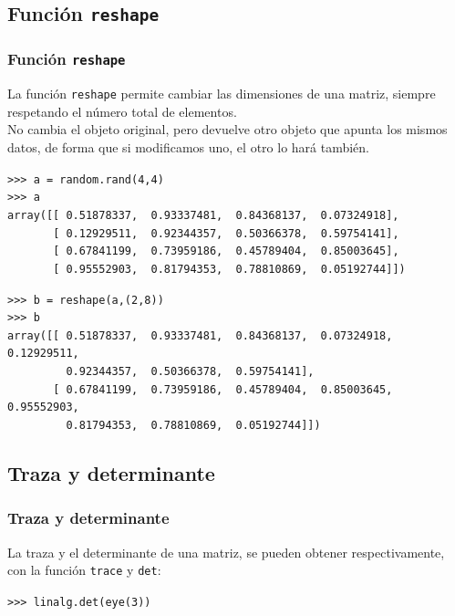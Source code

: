 \subsection{Funci\'{o}n \texttt{reshape}}
\begin{frame}
\frametitle{Funci\'{o}n \texttt{reshape}}
La funci\'{o}n \texttt{reshape} permite cambiar las dimensiones de una matriz, siempre respetando el n\'{u}mero total de elementos.
\\
\bigskip
No cambia el objeto original, pero devuelve otro objeto que apunta los mismos datos, de forma que si modificamos uno, el otro lo har\'{a} tambi\'{e}n.
\end{frame}
\begin{frame}[fragile]
\verb|>>> a = random.rand(4,4)| \\
\fontsize{10}{10}\selectfont
\pause
\verb|>>> a| \\
\verb|array([[ 0.51878337,  0.93337481,  0.84368137,  0.07324918],| \\
\verb|       [ 0.12929511,  0.92344357,  0.50366378,  0.59754141],| \\
\verb|       [ 0.67841199,  0.73959186,  0.45789404,  0.85003645],| \\
\verb|       [ 0.95552903,  0.81794353,  0.78810869,  0.05192744]])|
\end{frame}
\begin{frame}[fragile]
\verb|>>> b = reshape(a,(2,8))| \\
\fontsize{10}{10}\selectfont
\pause
\verb|>>> b| \\
\pause
\verb|array([[ 0.51878337,  0.93337481,  0.84368137,  0.07324918,  0.12929511,| \\
\verb|         0.92344357,  0.50366378,  0.59754141],| \\
\verb|       [ 0.67841199,  0.73959186,  0.45789404,  0.85003645,  0.95552903,| \\
\verb|         0.81794353,  0.78810869,  0.05192744]])|
\end{frame}
\subsection{Traza y determinante}
\begin{frame}[fragile]
\frametitle{Traza y determinante}
La traza y el determinante de una matriz, se pueden obtener respectivamente, con la funci\'{o}n \texttt{trace} y \texttt{det}:
\begin{exampleblock}{}
\verb|>>> linalg.det(eye(3))| \\
 \\
 \\
\end{exampleblock}
\end{frame}
